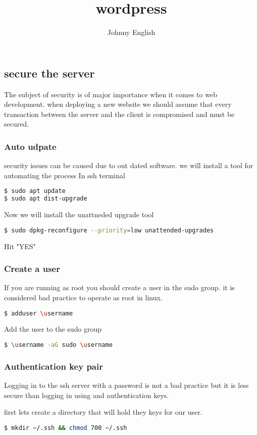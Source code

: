 \documentclass{book}
\title{wordpress}
\author{Johnny English}
\begin{document}
\maketitle
{
\hypersetup{linkcolor=black}
\tableofcontents
}
\part{}
\chapter{secure the server}
The subject of security is of major importance when it comes to web development.
when deploying a new website we should assume that every transaction between the 
server and the client is compromised and must be secured. 

\section{Auto udpate}
security issues can be caused due to out dated software. we will install a tool for 
automating the process
In ssh terminal
\begin{lstlisting}[language=bash]
$ sudo apt update
$ sudo apt dist-upgrade
\end{lstlisting}
Now we will install the unattneded upgrade tool
\begin{lstlisting}[language=bash]
$ sudo dpkg-reconfigure --priority=low unattended-upgrades
\end{lstlisting}
Hit "YES"

\section{Create a user}
If you are running as root you should create a user in the sudo group.
it is considered bad practice to operate as root in linux. 

\begin{lstlisting}[language=bash]
$ adduser \username
\end{lstlisting}
Add the user to the sudo group
\begin{lstlisting}[language=bash]
$ \username -aG sudo \username
\end{lstlisting}

\section{Authentication key pair}
Logging in to the ssh server with a password is not a bad practice but it is less
secure than logging in using and authentication keys.

first lets create a directory that will hold they keys for our user.
\begin{lstlisting}[language=bash]
$ mkdir ~/.ssh && chmod 700 ~/.ssh
\end{lstlisting}
\end{document}

